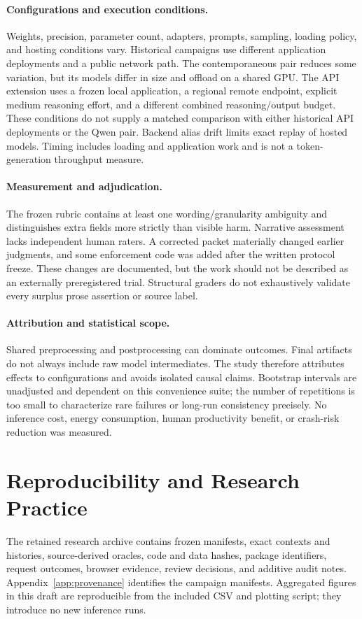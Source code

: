 \documentclass[10pt,twocolumn,letterpaper]{article}
\begin{document}
\paragraph{Configurations and execution conditions.}
Weights, precision, parameter count, adapters, prompts, sampling, loading policy, and hosting conditions vary. Historical campaigns use different application deployments and a public network path. The contemporaneous pair reduces some variation, but its models differ in size and offload on a shared GPU. The API extension uses a frozen local application, a regional remote endpoint, explicit medium reasoning effort, and a different combined reasoning/output budget. These conditions do not supply a matched comparison with either historical API deployments or the Qwen pair. Backend alias drift limits exact replay of hosted models. Timing includes loading and application work and is not a token-generation throughput measure.

\paragraph{Measurement and adjudication.}
The frozen rubric contains at least one wording/granularity ambiguity and distinguishes extra fields more strictly than visible harm. Narrative assessment lacks independent human raters. A corrected packet materially changed earlier judgments, and some enforcement code was added after the written protocol freeze. These changes are documented, but the work should not be described as an externally preregistered trial. Structural graders do not exhaustively validate every surplus prose assertion or source label.

\paragraph{Attribution and statistical scope.}
Shared preprocessing and postprocessing can dominate outcomes. Final artifacts do not always include raw model intermediates. The study therefore attributes effects to configurations and avoids isolated causal claims. Bootstrap intervals are unadjusted and dependent on this convenience suite; the number of repetitions is too small to characterize rare failures or long-run consistency precisely. No inference cost, energy consumption, human productivity benefit, or crash-risk reduction was measured.

\section{Reproducibility and Research Practice}
The retained research archive contains frozen manifests, exact contexts and histories, source-derived oracles, code and data hashes, package identifiers, request outcomes, browser evidence, review decisions, and additive audit notes. Appendix~\ref{app:provenance} identifies the campaign manifests. Aggregated figures in this draft are reproducible from the included CSV and plotting script; they introduce no new inference runs.
\end{document}
